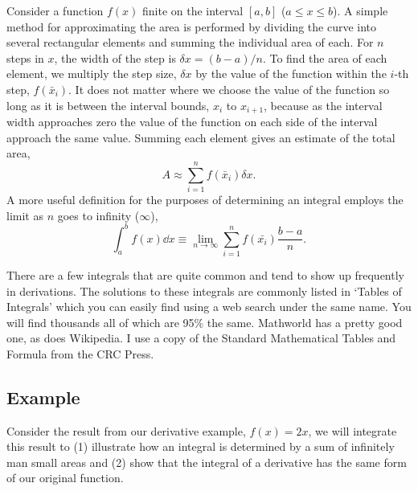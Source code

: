 Consider a function $f(x)$ finite on the interval $[a, b]$ ($a \leq x \leq b$).
A simple method for approximating the area is performed by dividing the curve
into several rectangular elements and summing the individual area of each.  For
$n$ steps in $x$, the width of the step is $\delta\! x = (b - a)/n$.  To find
the area of each element, we multiply the step size, $\delta\! x$ by the value
of the function within the $i$-th step, $f(\bar{x}_i)$.  It does not matter
where we choose the value of the function so long as it is between the interval
bounds, $x_i$ to $x_{i+1}$, because as the interval width approaches zero the
value of the function on each side of the interval approach the same value.
Summing each element gives an estimate of the total area, 
\begin{equation*}
    A \approx \sum_{i = 1}^{n} f(\bar{x}_{i}) \delta x.
\end{equation*}
A more useful definition for the purposes of determining an integral employs the
limit as $n$ goes to infinity ($\infty$),
\begin{equation*}
    \int_{a}^{b} f(x) \dd{x} \equiv \lim_{n \to \infty} \sum_{i = 1}^{n}
        f(\bar{x_{i}}) \frac{b - a}{n}.
\end{equation*}

There are a few integrals that are quite common and tend to show up frequently
in derivations.  The solutions to these integrals are commonly listed in `{Tables
of Integrals}' which you can easily find using a web search under the same name.
You will find thousands all of which are 95\% the same.  Mathworld has a pretty
good one, as does Wikipedia.  I use a copy of the Standard Mathematical Tables
and Formula from the CRC Press.

\subsection{Example}
Consider the result from our derivative example, $f(x) = 2 x$, we will integrate
this result to (1) illustrate how an integral is determined by a sum of
infinitely man small areas
and (2) show that the integral of a derivative has the same form of our original
function.

